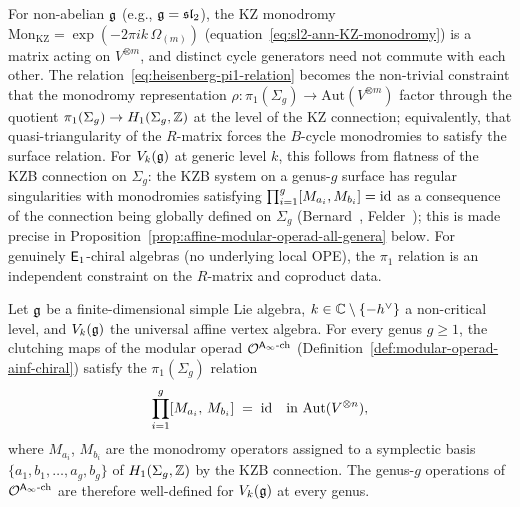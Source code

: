 \begin{remark}
\label{rem:non-abelian-pi1-constraint}
For non-abelian $\mathfrak{g}$ (e.g.,
$\mathfrak{g} = \mathfrak{sl}_2$), the KZ monodromy
$\mathrm{Mon}_{\mathrm{KZ}} = \exp(-2\pi ik\,\Omega_{(m)})$
(equation~\eqref{eq:sl2-ann-KZ-monodromy})
is a matrix acting on $V^{\otimes m}$, and
distinct cycle generators need not commute
with each other. The
relation~\eqref{eq:heisenberg-pi1-relation} becomes
the non-trivial constraint that the monodromy
representation
$\rho\colon \pi_1(\Sigma_g) \to
\mathrm{Aut}(V^{\otimes m})$ factor through the
quotient $\pi_1(\Sigma_g) \to H_1(\Sigma_g, \mathbb{Z})$
at the level of the KZ connection; equivalently,
that quasi-triangularity of the $R$-matrix forces
the $B$-cycle monodromies to satisfy the surface
relation. For $V_k(\mathfrak{g})$ at generic level $k$, this
follows from flatness of the KZB connection on
$\Sigma_g$: the KZB system on a genus-$g$ surface has
regular singularities with monodromies satisfying
$\prod_{i=1}^g [M_{a_i}, M_{b_i}] = \mathrm{id}$ as a
consequence of the connection being globally defined
on $\Sigma_g$
(Bernard~\cite{Ber88}, Felder~\cite{Fel94});
this is made precise in
Proposition~\ref{prop:affine-modular-operad-all-genera}
below.
For genuinely $\mathsf{E}_1$-chiral algebras (no underlying
local OPE), the $\pi_1$ relation is an independent
constraint on the $R$-matrix and coproduct data.
\end{remark}

\begin{proposition}
\label{prop:affine-modular-operad-all-genera}
Let $\mathfrak{g}$ be a finite-dimensional simple Lie algebra,
$k \in \mathbb{C} \setminus \{-h^\vee\}$ a non-critical level,
and $V_k(\mathfrak{g})$ the universal affine vertex algebra.
For every genus $g \ge 1$, the clutching maps of the
modular operad $\mathcal{O}^{\mathsf{A}_{\infty}\textup{-ch}}$
\textup{(}Definition~\textup{\ref{def:modular-operad-ainf-chiral}}\textup{)}
satisfy the $\pi_1(\Sigma_g)$ relation
\begin{equation}\label{eq:affine-pi1-all-genera}
\prod_{i=1}^{g}
[M_{a_i},\, M_{b_i}]
\;=\; \mathrm{id}
\quad
\text{in } \mathrm{Aut}(V^{\otimes n}),
\end{equation}
where $M_{a_i}$, $M_{b_i}$ are the monodromy operators
assigned to a symplectic basis
$\{a_1, b_1, \dotsc, a_g, b_g\}$ of
$H_1(\Sigma_g, \mathbb{Z})$ by the KZB connection.
The genus-$g$ operations of
$\mathcal{O}^{\mathsf{A}_{\infty}\textup{-ch}}$ are therefore
well-defined for $V_k(\mathfrak{g})$ at every genus.
\end{proposition}

